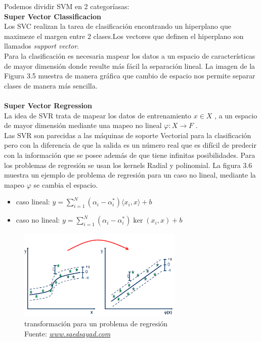 Podemos dividir SVM en 2 categoríasas:\\
\textbf{Super Vector Classificacion}\\
Los SVC realizan la tarea de clasificación encontrando un hiperplano que maximeze el margen entre 2 clases.Los vectores que definen el hiperplano son llamados \textit{support vector}.\\ Para la clasificación es necesaria mapear los datos a un espacio de características de mayor dimensión donde resulte más fácil la separación lineal.  La imagen de la Figura 3.5 muestra de manera gráfica que cambio de espacio nos permite separar clases de manera más sencilla.\\ \\
\textbf{Super Vector Regression}\\
La idea de SVR trata de mapear los datos de entrenamiento $x \in X$ , a un espacio de mayor dimensión mediante una mapeo no lineal $ \varphi : X \to F$ .\\
Las SVR son parecidas a las máquinas de soporte Vectorial para la clasificación pero con la diferencia de que la salida es un número real que es difícil de predecir con la información que se posee además de que tiene infinitas posibilidades. Para los problemas de regresión se usan los kernels Radial y polinomial. La figura 3.6 muestra un ejemplo de problema de regresión para un caso no lineal, mediante la mapeo $ \varphi $ se cambia el espacio.

\begin{itemize}
	\item caso lineal:     $y=\sum_{i=1}^{N}(\alpha_{i}  -\alpha_{i}^*)\langle x_{i},x\rangle +b$
	\item caso no lineal:  $ y=\sum_{i=1}^{N}(\alpha_{i}  -\alpha_{i}^*)\ker(x_{i},x) +b$
\end{itemize}

\begin{figure}[H]
	\centering
	\includegraphics[width=0.7\textwidth]{Figures/SVR.png}
	\caption{transformación para un problema de regresión \\ Fuente:  \href{http://www.saedsayad.com/support_vector_machine_reg.htm}{\textit{www.saedsayad.com}}}
	\label{transformacion}
\end{figure} 

